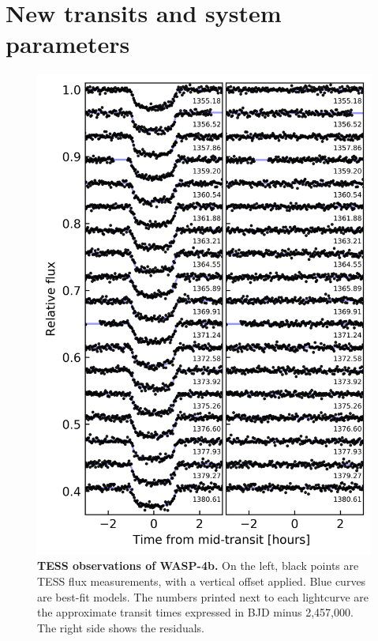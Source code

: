 \documentclass[12pt,twocolumn,tighten]{aastex62}
\begin{document}
\section{New transits and system parameters}
\label{sec:observations}

\begin{figure}[t]
    \begin{center}
		\includegraphics[height=0.97\textheight]{f1.png}
    \end{center}
    \vspace{-0.8cm}
    \caption{
      {\bf TESS observations of WASP-4b.} On the left, black points
      are TESS flux measurements, with a vertical offset applied. Blue
      curves are best-fit models. The numbers printed next to each
      lightcurve are the approximate transit times expressed in BJD
      minus 2{,}457{,}000.  The right side shows the residuals.
       \label{fig:lightcurves}
    }
\end{figure}
\end{document}
